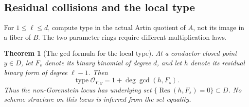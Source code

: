 \documentclass[10pt,fleqn]{article}
\numberwithin{equation}{section}
\newtheorem{theorem}{Theorem}[section]
\newcommand{\Res}{\operatorname{Res}}
\begin{document}
\subsection{Residual collisions and the local type}
\label{r22:mixed:artin-type}

For $1\le\ell\le d$, compute type in the actual Artin quotient of
$A$, not its image in a fiber of $B$.  The two parameter rings require
different multiplication laws.

\begin{theorem}[The gcd formula for the local type]
\label{v7:mixed:type}
At a conductor closed point $y\in D$, let $F_s$ denote its binary
binomial of degree $d$, and let $h$ denote its residual binary form of
degree $\ell-1$.  Then
\begin{equation}\label{v7:mixed:gcd-type}
 \operatorname{type}\mathcal O_{Y,y}
          =1+\deg\gcd(h,F_s).
\end{equation}
Thus the non-Gorenstein locus has underlying set
$\{\Res(h,F_s)=0\}\subset D$.  No scheme structure on this locus is
inferred from the set equality.
\end{theorem}
\end{document}
